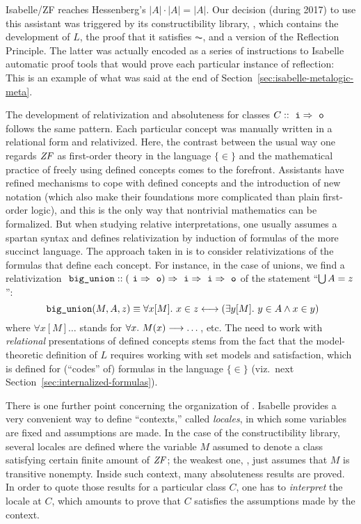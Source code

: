Isabelle/ZF reaches Hessenberg's $|A|\cdot|A| = |A|$. Our decision
(during 2017) to
use this assistant was triggered by its constructibility
library,  \citep{paulson_2003},
which contains the development of $L$, the proof that it satisfies
$\AC$, and a version of the Reflection Principle. The latter was
actually encoded as a series of instructions to Isabelle automatic
proof tools that would prove each particular instance of reflection:
This is an example of what was said at the end of Section~\ref{sec:isabelle-metalogic-meta}.

The development of relativization and absoluteness for classes $C::
\isatt{i} \fun \isatt{o}$ follows the same pattern. Each particular
concept was manually written in a relational form and relativized.
Here, the contrast between the usual way one regards $\mathit{ZF}$ as
first-order theory in the language $\{\in \}$ and the mathematical
practice of freely using defined concepts comes to the
forefront. Assistants have refined mechanisms to cope with defined
concepts and the introduction of new notation (which also make their foundations more complicated
than plain first-order logic), and this is the only way that nontrivial
mathematics can be formalized. But when studying relative interpretations, one
usually assumes a spartan syntax and defines relativization by
induction of formulas of the more succinct language. The approach
taken in  is to consider relativizations of
the formulas that define each concept. For instance,
in the case of unions, we find a relativization
$\isatt{big{\uscore}union}:: (\isatt{i} \fun \isatt{o}) \fun \isatt{i}
\fun \isatt{i} \fun \isatt{o}$ of the statement
“$\mathop{\textstyle\bigcup} A = z$”:
\[
 \isatt{big{\uscore}union}(M,A,z) \equiv \forall x[M].\ x \in z
 \longleftrightarrow (\exists y[M].\ y \in A \land x \in y)
\]
where $\forall x[M]\dots$ stands for $\forall x.\ M(x)\longrightarrow \dots$,
etc. The need to work with \emph{relational} presentations of defined
concepts stems from the fact that the model-theoretic definition of
$L$ requires working with set models and satisfaction, which is
defined for (“codes” of) formulas in the language $\{\in \}$
(viz.\ next Section~\ref{sec:internalized-formulas}).

There is one further point concerning the organization of
. Isabelle provides a very convenient way to
define “contexts,” called \emph{locales}, in which some variables are
fixed and assumptions are made. In the case of the constructibility
library, several locales are defined where the variable $M$ assumed to
denote a class satisfying certain finite amount of $\mathit{ZF}$; the weakest
one,  \cite[Sect.~3]{2020arXiv200109715G}, just
assumes that $M$ is transitive nonempty. Inside such context, many
absoluteness results are proved. In order to quote those results for a
particular class $C$, one has to \emph{interpret} the locale at
$C$, which amounts to prove that $C$ satisfies the assumptions made by
the context.

